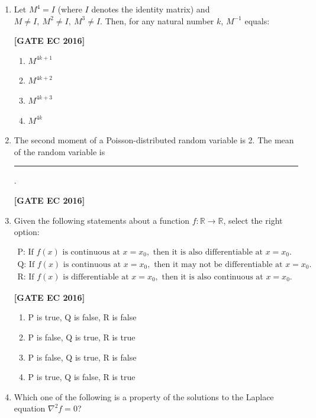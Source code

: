 \documentclass[12pt]{article}
\begin{document}
\begin{enumerate}[label=\textbf{Q.\arabic*.}, start=6, itemsep=2em]
\begin{enumerate}[label=\textbf{Q.\arabic*.}]
\item Let $M^4 = I$ (where $I$ denotes the identity matrix) and $M \neq I,\ M^2 \neq I,\ M^3 \neq I$. Then, for any natural number $k$, $M^{-1}$ equals:

\noindent \textbf{[GATE EC 2016]}

\begin{multicols}{2}
\begin{enumerate}[label=\alph*.]
    \item $M^{4k+1}$
    \item $M^{4k+2}$
    \item $M^{4k+3}$
    \item $M^{4k}$
\end{enumerate}
\end{multicols}

\item The second moment of a Poisson-distributed random variable is 2. The mean of the random variable is \rule{2.5cm}{0.4pt}.

\noindent \textbf{[GATE EC 2016]}

\item Given the following statements about a function $f:\mathbb{R}\to\mathbb{R}$, select the right option:

\[
\begin{array}{ll}
\text{P: If }f(x)\text{ is continuous at }x=x_0, \text{ then it is also differentiable at }x=x_0. & \\
\text{Q: If }f(x)\text{ is continuous at }x=x_0, \text{ then it may not be differentiable at }x=x_0. & \\
\text{R: If }f(x)\text{ is differentiable at }x=x_0, \text{ then it is also continuous at }x=x_0. &
\end{array}
\]

\noindent \textbf{[GATE EC 2016]}

\begin{multicols}{2}
\begin{enumerate}[label=\alph*.]
    \item P is true, Q is false, R is false
    \item P is false, Q is true, R is true
    \item P is false, Q is true, R is false
    \item P is true, Q is false, R is true
\end{enumerate}
\end{multicols}

\item Which one of the following is a property of the solutions to the Laplace equation $\nabla^2 f = 0$?


\end{enumerate}
\end{enumerate}
\end{document}
